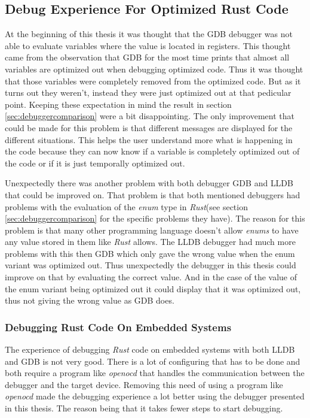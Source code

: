 \subsection{Debug Experience For Optimized Rust Code}
At the beginning of this thesis it was thought that the \gls{GDB} debugger was not able to evaluate variables where the value is located in registers.
This thought came from the observation that \gls{GDB} for the most time prints that almost all variables are optimized out when debugging optimized code.
Thus it was thought that those variables were completely removed from the optimized code.
But as it turns out they weren't, instead they were just optimized out at that pedicular point.
Keeping these expectation in mind the result in section \ref{sec:debuggercomparison} were a bit disappointing.
The only improvement that could be made for this problem is that different messages are displayed for the different situations.
This helps the user understand more what is happening in the code because they can now know if a variable is completely optimized out of the code or if it is just temporally optimized out.


Unexpectedly there was another problem with both debugger \gls{GDB} and \gls{LLDB} that could be improved on.
That problem is that both mentioned debuggers had problems with the evaluation of the \emph{enum} type in \emph{Rust}(see section \ref{sec:debuggercomparison} for the specific problems they have).
The reason for this problem is that many other programming language doesn't allow \emph{enums} to have any value stored in them like \emph{Rust} allows.
The \gls{LLDB} debugger had much more problems with this then \gls{GDB} which only gave the wrong value when the enum variant was optimized out.
Thus unexpectedly the debugger in this thesis could improve on that by evaluating the correct value.
And in the case of the value of the  enum variant being optimized out it could display that it was optimized out, thus not giving the wrong value as \gls{GDB} does.


\subsubsection{Debugging Rust Code On Embedded Systems}
The experience of debugging \emph{Rust} code on embedded systems with both \gls{LLDB} and \gls{GDB} is not very good.
There is a lot of configuring that has to be done and both require a program like \emph{openocd} that handles the communication between the debugger and the target device.
Removing this need of using a program like \emph{openocd} made the debugging experience a lot better using the debugger presented in this thesis.
The reason being that it takes fewer steps to start debugging.


